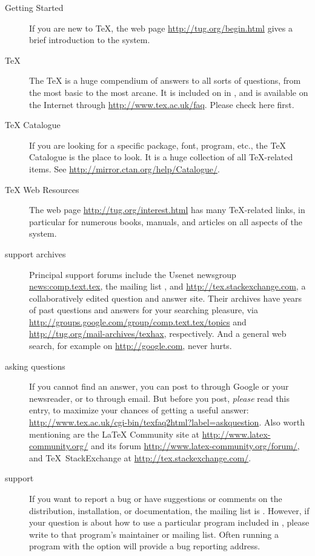 \documentclass{article}
\begin{document}
\begin{description}
\item [Getting Started] If you are new to \TeX, the web page
\url{http://tug.org/begin.html} gives a brief introduction to the system.

\item [\TeX{} ] The \TeX{}  is a huge compendium
  of answers to all sorts of questions, from the most basic to the
  most arcane.  It is included on \TL{} in
  , and is available
  on the Internet through \url{http://www.tex.ac.uk/faq}.  Please
  check here first.

\item [\TeX{} Catalogue] If you are looking for a specific package,
font, program, etc., the \TeX{} Catalogue is the place to look.  It is a
huge collection of all \TeX{}-related items.  See
\url{http://mirror.ctan.org/help/Catalogue/}.

\item [\TeX{} Web Resources] The web page
\url{http://tug.org/interest.html} has many \TeX{}-related links, in
particular for numerous books, manuals, and articles on all aspects of
the system.

\item [support archives] Principal support forums include the
Usenet newsgroup \url{news:comp.text.tex}, the mailing list
, and \url{http://tex.stackexchange.com}, a
collaboratively edited question and answer site.  Their archives have
years of past questions and answers for your searching pleasure, via
\url{http://groups.google.com/group/comp.text.tex/topics} and
\url{http://tug.org/mail-archives/texhax}, respectively.  And a general
web search, for example on \url{http://google.com}, never hurts.

\item [asking questions] If you cannot find an answer, you can post to
 through Google or your newsreader, or to
 through email.  But before you post,
\emph{please} read this  entry, to maximize
your chances of getting a useful answer:
\url{http://www.tex.ac.uk/cgi-bin/texfaq2html?label=askquestion}.
Also worth mentioning are the \LaTeX{} Community site at
\url{http://www.latex-community.org/} and its forum
\url{http://www.latex-community.org/forum/}, and 
\TeX\ StackExchange at \url{http://tex.stackexchange.com/}.

\item [\TL{} support] If you want to report a bug or have
suggestions or comments on the \TL{} distribution, installation, or
documentation, the mailing list is .  However,
if your question is about how to use a particular program included in
\TL{}, please write to that program's maintainer or
mailing list.  Often running a program with the  option
will provide a bug reporting address.

\end{description}
\end{document}
